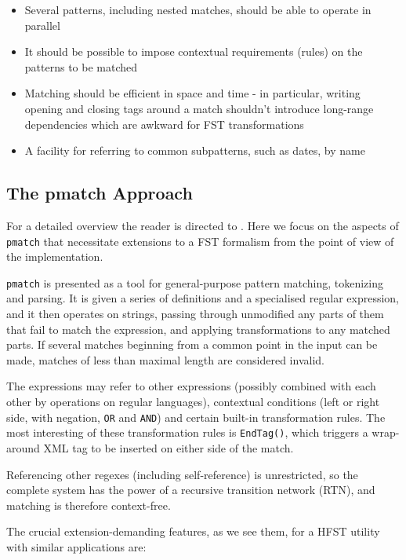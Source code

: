 \documentclass{llncs}
\begin{document}
\begin{itemize}
\item Several patterns, including nested matches,
should be able to operate in parallel
\item It should be possible to impose contextual requirements (rules) on
the patterns to be matched
\item Matching should be efficient in space and time - in particular, writing
opening and closing tags around a match shouldn't introduce long-range
dependencies which are awkward for FST transformations
\item A facility for referring to common subpatterns, such as dates, by name
\end{itemize}

\subsection{The pmatch Approach}

For a detailed overview the reader is directed to \cite{karttunen2011}.
Here we focus on the aspects of \verb!pmatch! that necessitate extensions
to a FST formalism from the point of view of the implementation.

\verb!pmatch! is presented as a tool for general-purpose pattern matching,
tokenizing and parsing. It is given a series of definitions and a
specialised regular expression, and it then operates on strings, passing
through unmodified any parts of them that fail to match the expression,
and applying transformations to any matched parts. If several matches beginning
from a common point in the input can be made, matches of less than maximal
length are considered invalid.

The expressions may refer to other expressions (possibly combined with each
other by operations on regular languages), contextual conditions
(left or right side, with negation, \verb!OR! and \verb!AND!) and certain
built-in transformation rules. The most interesting of these transformation
rules is \verb!EndTag()!, which triggers a wrap-around XML tag to be inserted
on either side of the match.

Referencing other regexes (including self-reference) is unrestricted, so
the complete system has the power of a recursive transition network (RTN),
and matching is therefore context-free.

The crucial extension-demanding features, as we see them, for a HFST utility
with similar applications are:
\end{document}
